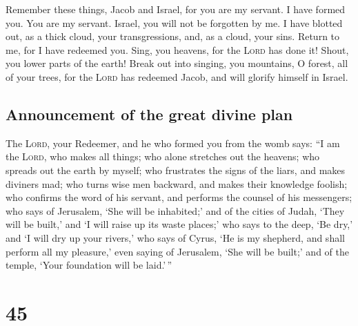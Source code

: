  Remember these things, Jacob and Israel, for you are my
servant. I have formed you. You are my servant. Israel, you will not be
forgotten by me.  I have blotted out, as a thick cloud,
your transgressions, and, as a cloud, your sins. Return to me, for I
have redeemed you.  Sing, you heavens, for the
\textsc{Lord} has done it! Shout, you lower parts of the earth! Break
out into singing, you mountains, O forest, all of your trees, for the
\textsc{Lord} has redeemed Jacob, and will glorify himself in Israel.

\hypertarget{announcement-of-the-great-divine-plan}{%
\subsection{Announcement of the great divine
plan}\label{announcement-of-the-great-divine-plan}}

 The \textsc{Lord}, your Redeemer, and he who formed you
from the womb says: ``I am the \textsc{Lord}, who makes all things; who
alone stretches out the heavens; who spreads out the earth by myself;
 who frustrates the signs of the liars, and makes
diviners mad; who turns wise men backward, and makes their knowledge
foolish;  who confirms the word of his servant, and
performs the counsel of his messengers; who says of Jerusalem, `She will
be inhabited;' and of the cities of Judah, `They will be built,' and `I
will raise up its waste places;'  who says to the deep,
`Be dry,' and `I will dry up your rivers,'  who says of
Cyrus, `He is my shepherd, and shall perform all my pleasure,' even
saying of Jerusalem, `She will be built;' and of the temple, `Your
foundation will be laid.'\,''

\hypertarget{section-44}{%
\section{45}\label{section-44}}


